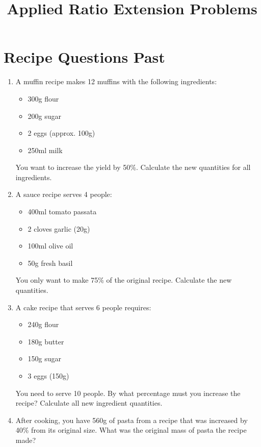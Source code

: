 \documentclass[12pt]{article}
\title{Applied Ratio Extension Problems}
\date{}
\begin{document}
\maketitle

\section*{Recipe Questions Past}

\begin{enumerate}
\item A muffin recipe makes 12 muffins with the following ingredients:
    \begin{itemize}
    \item 300g flour
    \item 200g sugar
    \item 2 eggs (approx. 100g)
    \item 250ml milk
    \end{itemize}
    You want to increase the yield by 50\%. Calculate the new quantities for all ingredients.

\item A sauce recipe serves 4 people:
    \begin{itemize}
    \item 400ml tomato passata
    \item 2 cloves garlic (20g)
    \item 100ml olive oil
    \item 50g fresh basil
    \end{itemize}
    You only want to make 75\% of the original recipe. Calculate the new quantities.

\item A cake recipe that serves 6 people requires:
    \begin{itemize}
    \item 240g flour
    \item 180g butter
    \item 150g sugar
    \item 3 eggs (150g)
    \end{itemize}
    You need to serve 10 people. By what percentage must you increase the recipe? Calculate all new ingredient quantities.

\item After cooking, you have 560g of pasta from a recipe that was increased by 40\% from its original size. What was the original mass of pasta the recipe made?

\newpage{}


\end{enumerate}
\end{document}
